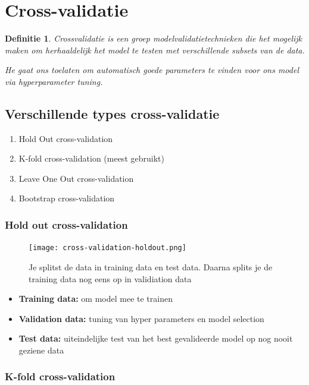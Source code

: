 \documentclass{article}
\newtheorem{theorem}{Definitie}[section]
\begin{document}
\section{Cross-validatie}

\begin{theorem}
    Crossvalidatie is een groep modelvalidatietechnieken die het mogelijk maken om
    herhaaldelijk het model te testen met verschillende subsets van de data.

    He gaat ons toelaten om automatisch goede parameters te vinden voor ons model via hyperparameter tuning.
\end{theorem}


\subsection{Verschillende types cross-validatie}

\begin{enumerate}
    \item Hold Out cross-validation
    \item K-fold cross-validation (meest gebruikt)
    \item Leave One Out cross-validation
    \item Bootstrap cross-validation
\end{enumerate}

\subsubsection{Hold out cross-validation}

\begin{figure}[H]
    \centering
    \texttt{[image: cross-validation-holdout.png]}
    \caption{Je splitst de data in training data en test data. Daarna splits je de training data nog eens op in validiation data}
\end{figure}

\begin{itemize}
    \item \textbf{Training data:} om model mee te trainen
    \item \textbf{Validation data:} tuning van hyper parameters en model selection
    \item \textbf{Test data:} uiteindelijke test van het best gevalideerde model op nog nooit geziene data
\end{itemize}

\subsubsection{K-fold cross-validation}
\end{document}
